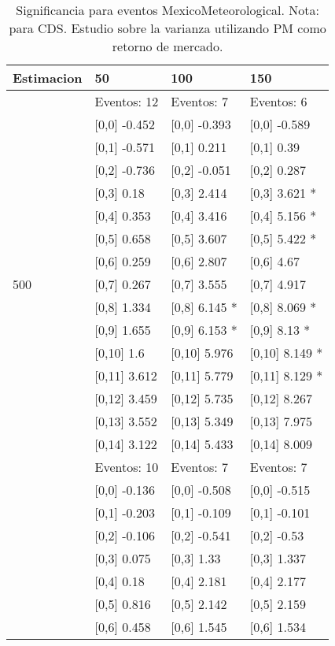 \begin{table}

\caption{Significancia para eventos MexicoMeteorological. Nota: para CDS. Estudio sobre la varianza utilizando PM como retorno de mercado.}
\centering
\begin{tabular}[t]{llll}
\toprule
Estimacion & 50 & 100 & 150\\
\midrule
 & Eventos:  12 & Eventos:  7 & Eventos:  6\\
 & {}[0,0] -0.452 & {}[0,0] -0.393 & {}[0,0] -0.589\\
 & {}[0,1] -0.571 & {}[0,1] 0.211 & {}[0,1] 0.39\\
 & {}[0,2] -0.736 & {}[0,2] -0.051 & {}[0,2] 0.287\\
 & {}[0,3] 0.18 & {}[0,3] 2.414 & {}[0,3] 3.621 *\\
\addlinespace
 & {}[0,4] 0.353 & {}[0,4] 3.416 & {}[0,4] 5.156 *\\
 & {}[0,5] 0.658 & {}[0,5] 3.607 & {}[0,5] 5.422 *\\
 & {}[0,6] 0.259 & {}[0,6] 2.807 & {}[0,6] 4.67\\
500 & {}[0,7] 0.267 & {}[0,7] 3.555 & {}[0,7] 4.917\\
 & {}[0,8] 1.334 & {}[0,8] 6.145 * & {}[0,8] 8.069 *\\
\addlinespace
 & {}[0,9] 1.655 & {}[0,9] 6.153 * & {}[0,9] 8.13 *\\
 & {}[0,10] 1.6 & {}[0,10] 5.976 & {}[0,10] 8.149 *\\
 & {}[0,11] 3.612 & {}[0,11] 5.779 & {}[0,11] 8.129 *\\
 & {}[0,12] 3.459 & {}[0,12] 5.735 & {}[0,12] 8.267\\
 & {}[0,13] 3.552 & {}[0,13] 5.349 & {}[0,13] 7.975\\
\addlinespace
 & {}[0,14] 3.122 & {}[0,14] 5.433 & {}[0,14] 8.009\\
 & Eventos:  10 & Eventos:  7 & Eventos:  7\\
 & {}[0,0] -0.136 & {}[0,0] -0.508 & {}[0,0] -0.515\\
 & {}[0,1] -0.203 & {}[0,1] -0.109 & {}[0,1] -0.101\\
 & {}[0,2] -0.106 & {}[0,2] -0.541 & {}[0,2] -0.53\\
\addlinespace
 & {}[0,3] 0.075 & {}[0,3] 1.33 & {}[0,3] 1.337\\
 & {}[0,4] 0.18 & {}[0,4] 2.181 & {}[0,4] 2.177\\
 & {}[0,5] 0.816 & {}[0,5] 2.142 & {}[0,5] 2.159\\
 & {}[0,6] 0.458 & {}[0,6] 1.545 & {}[0,6] 1.534\\

\end{tabular}
\end{table}
